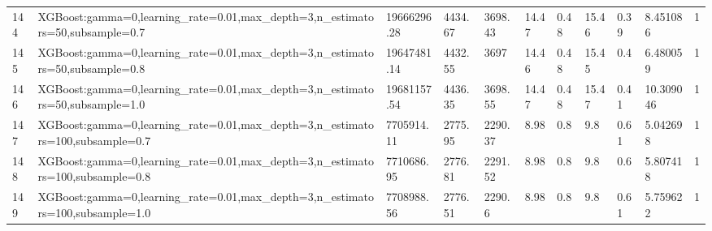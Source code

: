 \begin{longtable}{C{0.8cm} L{2cm} C{1.15cm} C{1.15cm} C{1.15cm} C{1.15cm} C{0.85cm} C{1.25cm} C{1.2cm} C{1.5cm} C{1.0cm}}
144 & XGBoost:\newline gamma=0,\newline learning\_rate=0.01,\newline max\_depth=3,\newline n\_estimators=50,\newline subsample=0.7 & 19666296.28 & 4434.67 & 3698.43 & 14.47 & 0.48 & 15.46 & 0.39 & 8.451086 & 1 \\
145 & XGBoost:\newline gamma=0,\newline learning\_rate=0.01,\newline max\_depth=3,\newline n\_estimators=50,\newline subsample=0.8 & 19647481.14 & 4432.55 & 3697 & 14.46 & 0.48 & 15.45 & 0.4 & 6.480059 & 1 \\
146 & XGBoost:\newline gamma=0,\newline learning\_rate=0.01,\newline max\_depth=3,\newline n\_estimators=50,\newline subsample=1.0 & 19681157.54 & 4436.35 & 3698.55 & 14.47 & 0.48 & 15.47 & 0.41 & 10.309046 & 1 \\
147 & XGBoost:\newline gamma=0,\newline learning\_rate=0.01,\newline max\_depth=3,\newline n\_estimators=100,\newline subsample=0.7 & 7705914.11 & 2775.95 & 2290.37 & 8.98 & 0.8 & 9.8 & 0.61 & 5.042698 & 1 \\
148 & XGBoost:\newline gamma=0,\newline learning\_rate=0.01,\newline max\_depth=3,\newline n\_estimators=100,\newline subsample=0.8 & 7710686.95 & 2776.81 & 2291.52 & 8.98 & 0.8 & 9.8 & 0.6 & 5.807418 & 1 \\
149 & XGBoost:\newline gamma=0,\newline learning\_rate=0.01,\newline max\_depth=3,\newline n\_estimators=100,\newline subsample=1.0 & 7708988.56 & 2776.51 & 2290.6 & 8.98 & 0.8 & 9.8 & 0.61 & 5.759622 & 1 \\

\end{longtable}
